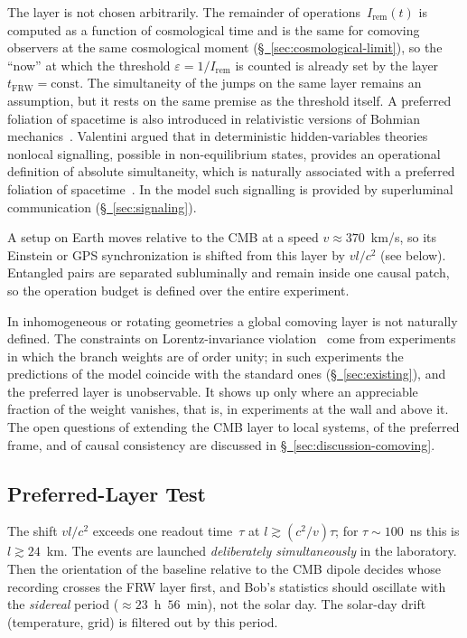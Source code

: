 \documentclass[11pt,a4paper]{article}
\newcommand{\Ost}{I_{\mathrm{rem}}}
\begin{document}
The layer is not chosen arbitrarily. The remainder of operations~$\Ost(t)$ is computed as a function of cosmological time and is the same for comoving observers at the same cosmological moment (\hyperref[sec:cosmological-limit]{\S~\ref*{sec:cosmological-limit}}), so the ``now'' at which the threshold $\varepsilon=1/\Ost$ is counted is already set by the layer $t_{\mathrm{FRW}}=\mathrm{const}$. The simultaneity of the jumps on the same layer remains an assumption, but it rests on the same premise as the threshold itself. A preferred foliation of spacetime is also introduced in relativistic versions of Bohmian mechanics~\cite{durr2014}. Valentini argued that in deterministic hidden-variables theories nonlocal signalling, possible in non-equilibrium states, provides an operational definition of absolute simultaneity, which is naturally associated with a preferred foliation of spacetime~\cite{valentini2008}. In the model such signalling is provided by superluminal communication (\hyperref[sec:signaling]{\S~\ref*{sec:signaling}}).

A setup on Earth moves relative to the CMB at a speed $v\approx370$~km/s, so its Einstein or GPS synchronization is shifted from this layer by $vl/c^2$ (see below). Entangled pairs are separated subluminally and remain inside one causal patch, so the operation budget is defined over the entire experiment.

In inhomogeneous or rotating geometries a global comoving layer is not naturally defined. The constraints on Lorentz-invariance violation~\cite{mattingly2005,liberati2013} come from experiments in which the branch weights are of order unity; in such experiments the predictions of the model coincide with the standard ones (\hyperref[sec:existing]{\S~\ref*{sec:existing}}), and the preferred layer is unobservable. It shows up only where an appreciable fraction of the weight vanishes, that is, in experiments at the wall and above it. The open questions of extending the CMB layer to local systems, of the preferred frame, and of causal consistency are discussed in \hyperref[sec:discussion-comoving]{\S~\ref*{sec:discussion-comoving}}.

\subsection{Preferred-Layer Test}
\label{sec:comoving-test}

The shift $vl/c^2$ exceeds one readout time~$\tau$ at $l\gtrsim(c^2/v)\tau$; for $\tau\sim100$~ns this is $l\gtrsim24$~km. The events are launched \emph{deliberately simultaneously} in the laboratory. Then the orientation of the baseline relative to the CMB dipole decides whose recording crosses the FRW layer first, and Bob's statistics should oscillate with the \emph{sidereal} period ($\approx23$~h~$56$~min), not the solar day. The solar-day drift (temperature, grid) is filtered out by this period.
\end{document}
